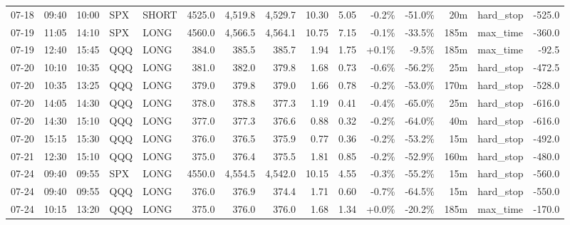 \documentclass[11pt,a4paper,twoside]{article}
\begin{document}
\begin{landscape}
\begin{center}
\begin{longtable}{>{\color{txtmain}}l l l l l r r r r r r r r >{\color{txtmain}}l r}
07-18 & 09:40 & 10:00 & SPX & SHORT & 4525.0 & 4,519.8 & 4,529.7 & 10.30 & 5.05 & \textcolor{lossred}{-0.2\%} & \textcolor{lossred}{-51.0\%} & 20m & hard\_stop & \textcolor{lossred}{-525.0} \\
07-19 & 11:05 & 14:10 & SPX & LONG & 4560.0 & 4,566.5 & 4,564.1 & 10.75 & 7.15 & \textcolor{lossred}{-0.1\%} & \textcolor{lossred}{-33.5\%} & 185m & max\_time & \textcolor{lossred}{-360.0} \\
07-19 & 12:40 & 15:45 & QQQ & LONG & 384.0 & 385.5 & 385.7 & 1.94 & 1.75 & \textcolor{wingreen}{+0.1\%} & \textcolor{lossred}{-9.5\%} & 185m & max\_time & \textcolor{lossred}{-92.5} \\
07-20 & 10:10 & 10:35 & QQQ & LONG & 381.0 & 382.0 & 379.8 & 1.68 & 0.73 & \textcolor{lossred}{-0.6\%} & \textcolor{lossred}{-56.2\%} & 25m & hard\_stop & \textcolor{lossred}{-472.5} \\
07-20 & 10:35 & 13:25 & QQQ & LONG & 379.0 & 379.8 & 379.0 & 1.66 & 0.78 & \textcolor{lossred}{-0.2\%} & \textcolor{lossred}{-53.0\%} & 170m & hard\_stop & \textcolor{lossred}{-528.0} \\
07-20 & 14:05 & 14:30 & QQQ & LONG & 378.0 & 378.8 & 377.3 & 1.19 & 0.41 & \textcolor{lossred}{-0.4\%} & \textcolor{lossred}{-65.0\%} & 25m & hard\_stop & \textcolor{lossred}{-616.0} \\
07-20 & 14:30 & 15:10 & QQQ & LONG & 377.0 & 377.3 & 376.6 & 0.88 & 0.32 & \textcolor{lossred}{-0.2\%} & \textcolor{lossred}{-64.0\%} & 40m & hard\_stop & \textcolor{lossred}{-616.0} \\
07-20 & 15:15 & 15:30 & QQQ & LONG & 376.0 & 376.5 & 375.9 & 0.77 & 0.36 & \textcolor{lossred}{-0.2\%} & \textcolor{lossred}{-53.2\%} & 15m & hard\_stop & \textcolor{lossred}{-492.0} \\
07-21 & 12:30 & 15:10 & QQQ & LONG & 375.0 & 376.4 & 375.5 & 1.81 & 0.85 & \textcolor{lossred}{-0.2\%} & \textcolor{lossred}{-52.9\%} & 160m & hard\_stop & \textcolor{lossred}{-480.0} \\
07-24 & 09:40 & 09:55 & SPX & LONG & 4550.0 & 4,554.5 & 4,542.0 & 10.15 & 4.55 & \textcolor{lossred}{-0.3\%} & \textcolor{lossred}{-55.2\%} & 15m & hard\_stop & \textcolor{lossred}{-560.0} \\
07-24 & 09:40 & 09:55 & QQQ & LONG & 376.0 & 376.9 & 374.4 & 1.71 & 0.60 & \textcolor{lossred}{-0.7\%} & \textcolor{lossred}{-64.5\%} & 15m & hard\_stop & \textcolor{lossred}{-550.0} \\
07-24 & 10:15 & 13:20 & QQQ & LONG & 375.0 & 376.0 & 376.0 & 1.68 & 1.34 & \textcolor{wingreen}{+0.0\%} & \textcolor{lossred}{-20.2\%} & 185m & max\_time & \textcolor{lossred}{-170.0} \\

\end{longtable}
\end{center}
\end{landscape}
\end{document}
